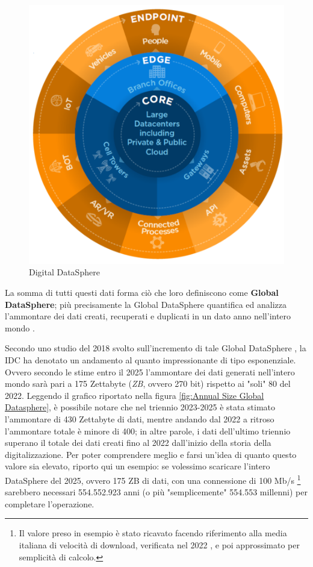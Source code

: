 \begin{figure}[H]
    \centering
    \includegraphics[width=0.5\linewidth]{figure/capitolo_1/Digital-Datasphere.pdf}
    \caption{Digital DataSphere}
    \label{fig:Digital-Datasphere}
\end{figure}

La somma di tutti questi dati forma ciò che loro definiscono come \textbf{Global DataSphere}; più precisamente la Global DataSphere quantifica ed analizza l'ammontare dei dati creati, recuperati e duplicati in un dato anno nell'intero mondo \cite{datadrivendaily_dimension_table}.

Secondo uno studio del 2018 svolto sull'incremento di tale Global DataSphere \cite{idc_global_datasphere}, la IDC ha denotato un andamento al quanto impressionante di tipo esponenziale. Ovvero secondo le stime entro il 2025 l'ammontare dei dati generati nell'intero mondo sarà pari a 175 Zettabyte (\textit{ZB}, ovvero 270 bit) rispetto ai "soli" 80 del 2022. Leggendo il grafico riportato nella figura \ref{fig:Annual Size Global Datasphere}, è possibile notare che nel triennio 2023-2025 è stata stimato l'ammontare di 430 Zettabyte di dati, mentre andando dal 2022 a ritroso l'ammontare totale è minore di 400; in altre parole, i dati dell'ultimo triennio superano il totale dei dati creati fino al 2022 dall'inizio della storia della digitalizzazione. Per poter comprendere meglio e farsi un'idea di quanto questo valore sia elevato, riporto qui un esempio: se volessimo scaricare l'intero DataSphere del 2025, ovvero 175 ZB di dati, con una connessione di 100 Mb/s \footnote{Il valore preso in esempio è stato ricavato facendo riferimento alla media italiana di velocità di download, verificata nel 2022 \cite{github_speed_connection}, e poi approssimato per semplicità di calcolo.} sarebbero necessari 554.552.923 anni (o più "semplicemente" 554.553 millenni) per completare l'operazione.

